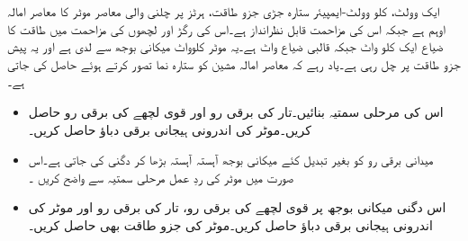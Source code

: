 %
ایک  وولٹ،  کلو وولٹ-ایمپیئر ستارہ جڑی  جزو طاقت،  ہرٹز پر چلنی والی معاصر موٹر کا معاصر امالہ  اوہم ہے جبکہ اس کی مزاحمت قابل نظرانداز ہے۔اس کی رگڑ اور لچھوں کی مزاحمت میں طاقت کا ضیاع ایک کلو واٹ جبکہ قالبی ضیاع  واٹ ہے۔یہ موٹر   کلوواٹ میکانی بوجھ سے لدی ہے اور یہ   پیش جزو طاقت   پر چل رہی ہے۔یاد رہے کہ معاصر امالہ مشین کو ستارہ نما تصور کرتے ہوئے حاصل کی جاتی ہے۔ 
\begin{itemize}
\item
اس کی مرحلی سمتیہ بنائیں۔تار کی برقی رو  اور قوی لچھے کی برقی رو   حاصل کریں۔موٹر کی اندرونی ہیجانی برقی دباؤ  حاصل کریں۔
\item
میدانی برقی رو کو بغیر تبدیل کئے  میکانی بوجھ آہستہ آہستہ بڑھا کر دگنی کی جاتی ہے۔اس صورت میں موٹر کی ردِ عمل مرحلی سمتیہ سے واضح کریں ۔
\item
اس دگنی میکانی بوجھ پر قوی لچھے  کی برقی رو،  تار کی برقی رو  اور موٹر کی اندرونی ہیجانی برقی دباؤ حاصل کریں۔موٹر کی جزو طاقت بھی حاصل کریں۔
\end{itemize}

